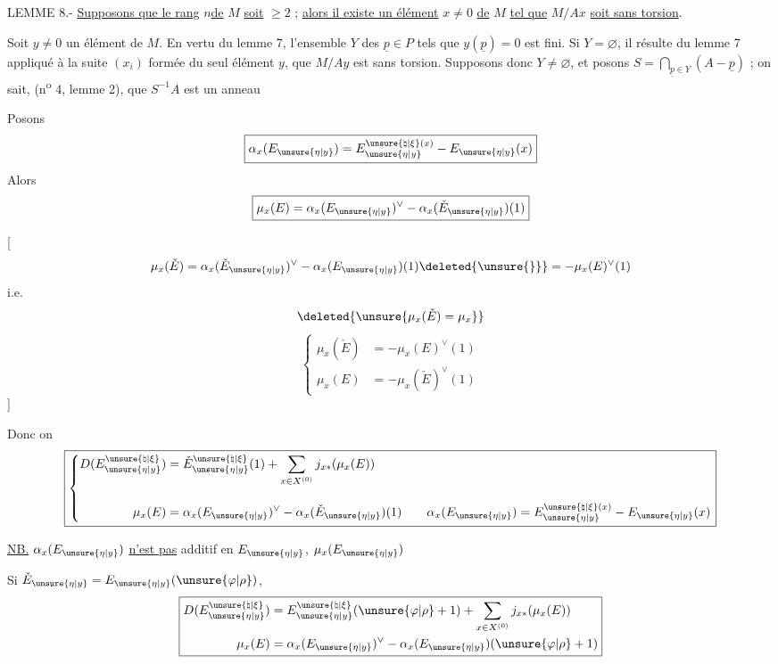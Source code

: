 LEMME 8.- \uline{Supposons que le rang} $n$\unsure{-}\uline{de} $M$ \uline{soit} $\ge2$ ; \uline{alors il existe un élément} $x\ne0$ \uline{de} $M$ \uline{tel que} $M/Ax$ \uline{soit sans torsion}.

Soit $y\ne0$ un élément de $M$. En vertu du lemme 7, l'ensemble $Y$ des $\underline{p}\in P$ tels que $y(\underline{p})=0$ est fini. Si $Y=\varnothing$, il résulte du lemme 7 appliqué à la suite $(x_i)$ formée du seul élément $y$, que $M/Ay$ est sans torsion. Supposons donc $Y\ne\varnothing$, et posons $S=\bigcap_{\underline{p}\in Y}(A-\underline{p})$ ; on sait, (n\textsuperscript{o} 4, lemme 2), que $S^{-1}A$ est un anneau

Posons
\[
\boxed{\alpha_x(E_{\unsure{\eta|y}})=E_{\unsure{\eta|y}}^{\unsure{\natural|\xi}(x)}-E_{\unsure{\eta|y}}(x)}
\]
Alors
\[
\boxed{\mu_x(E)=\alpha_x(E_{\unsure{\eta|y}})^\vee-\alpha_x(\check E_{\unsure{\eta|y}})(1)}
\]

[
\[
\mu_x(\check E)=\alpha_x(\check E_{\unsure{\eta|y}})^\vee-\alpha_x(E_{\unsure{\eta|y}})(1)\deleted{\unsure{\}}}=-\mu_x(E)^\vee(1)
\]
i.e.
\[
\deleted{\unsure{\mu_x(\check E)=\mu_x}}
\]
\[
\left\{\begin{aligned}
\mu_x(\check E)&=-\mu_x(E)^\vee(1)\\
\mu_x(E)&=-\mu_x(\check E)^\vee(1)
\end{aligned}\right.
\]
]

Donc on 
\[
\boxed{\left\{\begin{aligned}
D(E_{\unsure{\eta|y}}^{\unsure{\natural|\xi}})&=\check E_{\unsure{\eta|y}}^{\unsure{\natural|\xi}}(1)+\sum_{x\in X^{(0)}}j_{x*}(\mu_x(E))\\[1em]
\mu_x(E)&=\alpha_x(E_{\unsure{\eta|y}})^\vee-\alpha_x(\check E_{\unsure{\eta|y}})(1)\qquad
\alpha_x(E_{\unsure{\eta|y}})=E_{\unsure{\eta|y}}^{\unsure{\natural|\xi}(x)}-E_{\unsure{\eta|y}}(x)
\end{aligned}\right.}
\]

\uline{NB.} $\alpha_x(E_{\unsure{\eta|y}})$ \uline{n'est pas} additif en $E_{\unsure{\eta|y}}$,  $\mu_x(E_{\unsure{\eta|y}})$ 

Si $\check E_{\unsure{\eta|y}}=E_{\unsure{\eta|y}}(\unsure{\varphi|\rho})$, 
\[
\boxed{\begin{aligned}
D(E_{\unsure{\eta|y}}^{\unsure{\natural|\xi}})&=E_{\unsure{\eta|y}}^{\unsure{\natural|\xi}}(\unsure{\varphi|\rho}+1)+\sum_{x\in X^{(0)}}j_{x*}(\mu_x(E))\\
\mu_x(E)&=\alpha_x(E_{\unsure{\eta|y}})^\vee-\alpha_x(E_{\unsure{\eta|y}})(\unsure{\varphi|\rho}+1)
\end{aligned}}
\]

